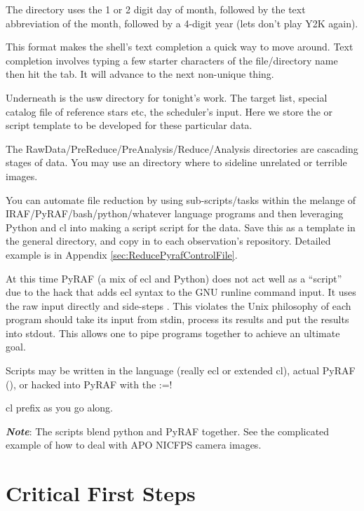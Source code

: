 \documentclass[letter,11pt,oneside]{article}
\makeatletter
\newcommand\llbox[1]{%
  \@tfor\@ii:=#1\do{%
    {\color{verbcolor}\Ovalbox{\strut\@ii}}%
  }%
}
\newcommand{\dhl}[1]{{\color{verbcolor}{\texttt#1}}}
\makeatother
\begin{document}
\centerline{{\huge{{\color{darkred}{SO! SPELL THE DATE OUT!}}}}}

The \dhl{ddMMMyyyy} directory uses the 1 or 2 digit day of month,
followed by the text abbreviation of the month, followed by a 4-digit
year (lets don't play Y2K again). 

This format makes the shell's text completion a quick way to move around.
Text completion involves typing a few starter characters of the file/directory
name then hit the tab. It will advance to the next non-unique thing.

Underneath \dhl{ddMMMyyyy} is the usw directory for tonight's work. The
target list, special catalog file of reference stars etc, the scheduler's
input. Here we store the \dhl{reduce.cl} or \dhl{reduce.py} script
template to be developed for these particular data.

The RawData/PreReduce/PreAnalysis/Reduce/Analysis directories are
cascading stages of data. You may use an \dhl{attic} directory where
to sideline unrelated or terrible images.

You can automate file reduction by using sub-scripts/tasks within the
melange of IRAF/PyRAF/bash/python/whatever language programs and then
leveraging Python and cl into making a
\dhl{OBSERVATION/usw/reduce.pyraf}
script script for the data. Save this as a template in
the general \dhl{usw} directory, and copy in to each observation's repository.
Detailed example is in Appendix \ref{sec:ReducePyrafControlFile}.

At this time PyRAF (a mix of ecl and Python) does not act well as a
``script'' due to the hack that adds ecl syntax to the GNU runline command
input. It uses the raw input directly and side-steps \dhl{stdin}. This
violates the Unix philosophy of each program should take its input from
stdin, process its results and put the results into stdout.  This
allows one to pipe programs together to achieve an ultimate goal.

Scripts may be written in the \dhl{.cl} language (really ecl or extended cl),
actual PyRAF (\dhl{.pyraf}), or hacked into PyRAF with the \llbox{!}
cl prefix as you go along.

\textbf{\emph{Note}}: The \dhl{.pyraf} scripts blend python and PyRAF together.
See the complicated example of how to deal with APO NICFPS camera
images.

\section{Critical First Steps}
\end{document}
